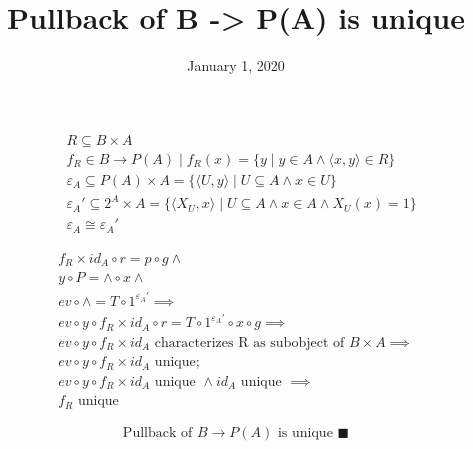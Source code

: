 \documentclass[11pt]{article}
\date{January 1, 2020}
\title{Pullback of B -> P(A) is unique}
\begin{document}
\begin{multicols}{2}

\columnbreak

\begin{equation*}
\begin{aligned}
& R \subseteq B \times A \\
& f_{R} \in B \rightarrow P(A) \mid f_{R}(x) = 
  \{y \mid y \in A \land \langle x, y \rangle \in R\} \\
& \varepsilon_{A} \subseteq P(A) \times A = 
  \{ \langle U, y \rangle \mid U \subseteq A \land x \in U \} \\
& \varepsilon_{A}' \subseteq 2^{A} \times A =
  \{ \langle X_{U}, x \rangle \mid 
      U \subseteq A \land x \in A \land X_{U}(x) = 1 \} \\
& \varepsilon_{A} \cong \varepsilon_{A}'
\end{aligned}
\end{equation*}

\end{multicols}

\begin{equation*}
\begin{aligned}
& f_{R} \times id_{A} \circ r = p \circ g \land \\
& y \circ P = \wedge \circ x \land \\
& ev \circ \wedge = T \circ 1^{\varepsilon_{A}'} \implies \\
& ev \circ y \circ f_{R} \times id_{A} \circ r =
  T \circ 1^{\varepsilon_{A}'} \circ x \circ g \implies \\
& ev \circ y \circ f_{R} \times id_{A} 
  \text{ characterizes R as subobject of } B \times A \implies \\
& ev \circ y \circ f_{R} \times id_{A} \text{ unique};
& \\
& ev \circ y \circ f_{R} \times id_{A} \text{ unique } \land
  id_{A} \text{ unique } \implies \\
& f_{R} \text{ unique}
\end{aligned}
\end{equation*}

\hrulefill

$$ \text{Pullback of } B \rightarrow P(A) \text{ is unique }\blacksquare $$
\end{document}
